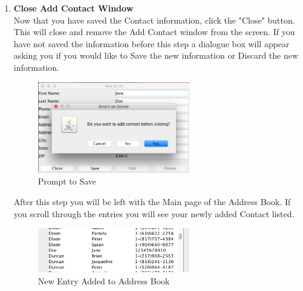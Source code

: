 \documentclass[a4paper, 11pt]{article}
\begin{document}
\begin{enumerate}[label=\textbf{\arabic*})]
    \item{\textbf{Close Add Contact Window}}\\ Now that you have saved the Contact information, click the "Close" button. This will close and remove the Add Contact window from the screen. If you have not saved the information before this step a dialogue box will appear asking you if you would like to Save the new information or Discard the new information.
    
    \begin{figure}[h!]
    \centering
      \includegraphics[width=250]{add_entry_save_error.png}
      \caption{Prompt to Save}
    \end{figure}
    
    \clearpage
    
    After this step you will be left with the Main page of the Address Book. If you scroll through the entries you will see your newly added Contact listed.
    
    \begin{figure}[h!]
    \centering
      \includegraphics[width=250]{jane_doe_added.png}
      \caption{New Entry Added to Address Book}
    \end{figure}
   
\end{enumerate}

\clearpage
\end{document}
